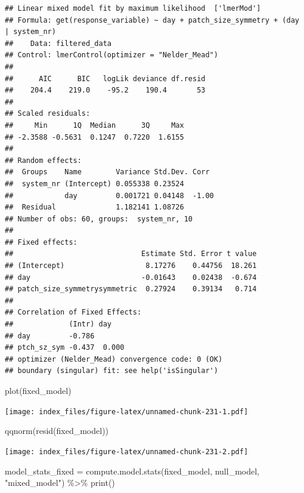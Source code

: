 \documentclass[
]{article}
\newenvironment{Shaded}{\begin{snugshade}}{\end{snugshade}}
\newcommand{\FunctionTok}[1]{\textcolor[rgb]{0.00,0.00,0.00}{#1}}
\newcommand{\NormalTok}[1]{#1}
\newcommand{\OtherTok}[1]{\textcolor[rgb]{0.56,0.35,0.01}{#1}}
\newcommand{\SpecialCharTok}[1]{\textcolor[rgb]{0.00,0.00,0.00}{#1}}
\newcommand{\StringTok}[1]{\textcolor[rgb]{0.31,0.60,0.02}{#1}}
\begin{document}
\begin{verbatim}
## Linear mixed model fit by maximum likelihood  ['lmerMod']
## Formula: get(response_variable) ~ day + patch_size_symmetry + (day | system_nr)
##    Data: filtered_data
## Control: lmerControl(optimizer = "Nelder_Mead")
## 
##      AIC      BIC   logLik deviance df.resid 
##    204.4    219.0    -95.2    190.4       53 
## 
## Scaled residuals: 
##     Min      1Q  Median      3Q     Max 
## -2.3588 -0.5631  0.1247  0.7220  1.6155 
## 
## Random effects:
##  Groups    Name        Variance Std.Dev. Corr 
##  system_nr (Intercept) 0.055338 0.23524       
##            day         0.001721 0.04148  -1.00
##  Residual              1.182141 1.08726       
## Number of obs: 60, groups:  system_nr, 10
## 
## Fixed effects:
##                              Estimate Std. Error t value
## (Intercept)                   8.17276    0.44756  18.261
## day                          -0.01643    0.02438  -0.674
## patch_size_symmetrysymmetric  0.27924    0.39134   0.714
## 
## Correlation of Fixed Effects:
##             (Intr) day   
## day         -0.786       
## ptch_sz_sym -0.437  0.000
## optimizer (Nelder_Mead) convergence code: 0 (OK)
## boundary (singular) fit: see help('isSingular')
\end{verbatim}

\begin{Shaded}
\begin{Highlighting}[]
\FunctionTok{plot}\NormalTok{(fixed\_model)}
\end{Highlighting}
\end{Shaded}

\texttt{[image: index\_files/figure-latex/unnamed-chunk-231-1.pdf]}

\begin{Shaded}
\begin{Highlighting}[]
\FunctionTok{qqnorm}\NormalTok{(}\FunctionTok{resid}\NormalTok{(fixed\_model))}
\end{Highlighting}
\end{Shaded}

\texttt{[image: index\_files/figure-latex/unnamed-chunk-231-2.pdf]}

\begin{Shaded}
\begin{Highlighting}[]
\NormalTok{model\_stats\_fixed }\OtherTok{=} \FunctionTok{compute.model.stats}\NormalTok{(fixed\_model,}
\NormalTok{                                              null\_model,}
                                              \StringTok{"mixed\_model"}\NormalTok{) }\SpecialCharTok{\%\textgreater{}\%}
  \FunctionTok{print}\NormalTok{()}
\end{Highlighting}
\end{Shaded}
\end{document}
